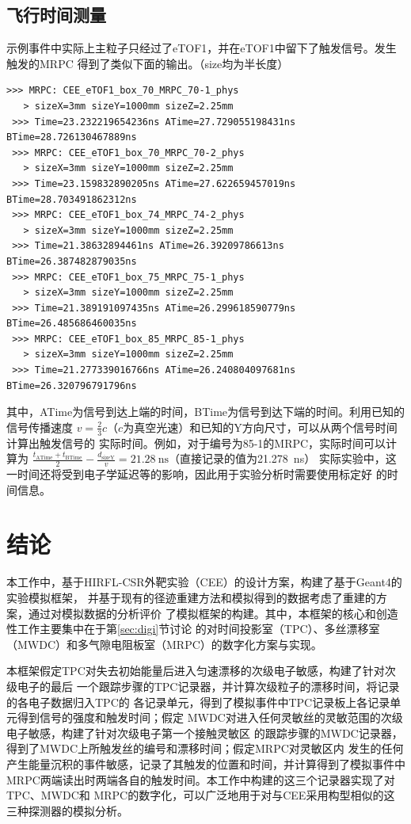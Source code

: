 \documentclass[bachelor,openany,oneside,color]{buaathesis}
\begin{document}
\section{飞行时间测量}

示例事件中实际上主粒子只经过了eTOF1，并在eTOF1中留下了触发信号。发生触发的MRPC
得到了类似下面的输出。（size均为半长度）

\begin{lstlisting}[firstnumber=4406,lastline=4453]
 >>> MRPC: CEE_eTOF1_box_70_MRPC_70-1_phys
   > sizeX=3mm sizeY=1000mm sizeZ=2.25mm 
 >>> Time=23.232219654236ns ATime=27.729055198431ns BTime=28.726130467889ns
 >>> MRPC: CEE_eTOF1_box_70_MRPC_70-2_phys
   > sizeX=3mm sizeY=1000mm sizeZ=2.25mm 
 >>> Time=23.159832890205ns ATime=27.622659457019ns BTime=28.703491862312ns
 >>> MRPC: CEE_eTOF1_box_74_MRPC_74-2_phys
   > sizeX=3mm sizeY=1000mm sizeZ=2.25mm 
 >>> Time=21.38632894461ns ATime=26.39209786613ns BTime=26.387482879035ns
 >>> MRPC: CEE_eTOF1_box_75_MRPC_75-1_phys
   > sizeX=3mm sizeY=1000mm sizeZ=2.25mm 
 >>> Time=21.389191097435ns ATime=26.299618590779ns BTime=26.485686460035ns
 >>> MRPC: CEE_eTOF1_box_85_MRPC_85-1_phys
   > sizeX=3mm sizeY=1000mm sizeZ=2.25mm 
 >>> Time=21.277339016766ns ATime=26.240804097681ns BTime=26.320796791796ns
\end{lstlisting}

其中，ATime为信号到达上端的时间，BTime为信号到达下端的时间。利用已知的信号传播速度
$v=\frac23c$（$c$为真空光速）和已知的Y方向尺寸，可以从两个信号时间计算出触发信号的
实际时间。例如，对于编号为85-1的MRPC，实际时间可以计算为
$\frac{t_{\text{ATime}}+t_{\text{BTime}}}{2}-\frac{d_{\text{sizeY}}}{v}
	=\SI{21.28}{\nano\second}$（直接记录的值为\SI{21.278}{\nano\second}）
实际实验中，这一时间还将受到电子学延迟等的影响，因此用于实验分析时需要使用标定好
的时间信息。


\chapter*{结论}
本工作中，基于HIRFL-CSR外靶实验（CEE）的设计方案，构建了基于Geant4的实验模拟框架，
并基于现有的径迹重建方法和模拟得到的数据考虑了重建的方案，通过对模拟数据的分析评价
了模拟框架的构建。其中，本框架的核心和创造性工作主要集中在于第\ref{sec:digi}节讨论
的对时间投影室（TPC）、多丝漂移室（MWDC）和多气隙电阻板室（MRPC）的数字化方案与实现。

本框架假定TPC对失去初始能量后进入匀速漂移的次级电子敏感，构建了针对次级电子的最后
一个跟踪步骤的TPC记录器，并计算次级粒子的漂移时间，将记录的各电子数据归入TPC的
各记录单元，得到了模拟事件中TPC记录板上各记录单元得到信号的强度和触发时间；假定
MWDC对进入任何灵敏丝的灵敏范围的次级电子敏感，构建了针对次级电子第一个接触灵敏区
的跟踪步骤的MWDC记录器，得到了MWDC上所触发丝的编号和漂移时间；假定MRPC对灵敏区内
发生的任何产生能量沉积的事件敏感，记录了其触发的位置和时间，并计算得到了模拟事件中
MRPC两端读出时两端各自的触发时间。本工作中构建的这三个记录器实现了对TPC、MWDC和
MRPC的数字化，可以广泛地用于对与CEE采用构型相似的这三种探测器的模拟分析。
\end{document}
